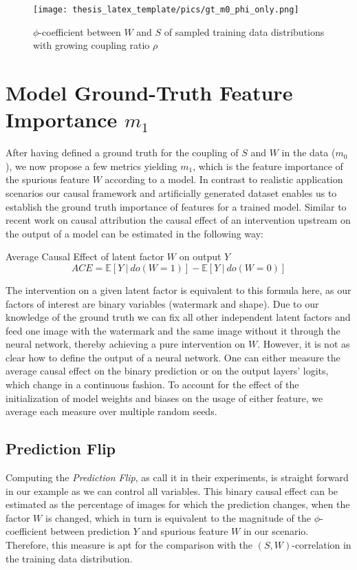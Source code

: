 \begin{figure}[t!]
    \centering
    \texttt{[image: thesis\_latex\_template/pics/gt\_m0\_phi\_only.png]}
    \caption[Data Distribution $m_0$]{$\phi$-coefficient between $W$ and $S$ of sampled training data distributions with growing coupling ratio $\rho$}
    \label{fig:finding_rho}
\end{figure}

\section{Model Ground-Truth Feature Importance $m_1$}\label{section:gt_measure}
After having defined a ground truth for the coupling of $S$ and $W$ in the data ($m_0$), we now propose a few metrics yielding $m_1$, which is the feature importance of the spurious feature $W$ according to a model.
In contrast to realistic application scenarios our causal framework and artificially generated dataset enables us to establish the ground truth importance of features for a trained model. Similar to recent work on causal attribution \citep{Goyal2019,Parafita2019,Karimi2023} the causal effect of an intervention upstream on the output of a model can be estimated in the following way:
\begin{center}
Average Causal Effect of latent factor $W$ on output $Y$ \\
\begin{equation}
\displaystyle ACE = \mathbb{E} [ Y \ | \ do(W=1) ] - \mathbb{E} [ Y \ | \ do(W=0) ] 
\end{equation}
\end{center}

The intervention on a given latent factor is equivalent to this formula here, as our factors of interest are binary variables (watermark and shape). Due to our knowledge of the ground truth we can fix all other independent latent factors and feed one image with the watermark and the same image without it through the neural network, thereby achieving a pure intervention on $W$.  
However, it is not as clear how to define the output of a neural network. One can either measure the average causal effect on the binary prediction or on the output layers' logits, which change in a continuous fashion.
To account for the effect of the initialization of model weights and biases on the usage of either feature, we average each measure over multiple random seeds.

\subsection{Prediction Flip}
Computing the \textit{Prediction Flip}, as \citeauthor{Sixt2022a} call it in their experiments, is straight forward in our example as we can control all variables. 
This binary causal effect can be estimated as the percentage of images for which the prediction changes, when the factor $W$ is changed, which in turn is equivalent to the magnitude of the $\phi$-coefficient between prediction $Y$ and spurious feature $W$ in our scenario. Therefore, this measure is apt for the comparison with the $(S,W)$-correlation in the training data distribution.

